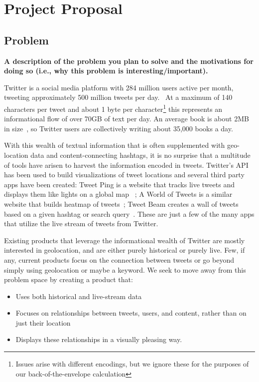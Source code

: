 \section{Project Proposal}

\subsection{Problem}
\textbf{A description of the problem you plan to solve and the motivations for doing so (i.e., why this problem is interesting/important).}

Twitter is a social media platform with 284 million users active per month, tweeting approximately 500 million tweets
per day.~\cite{twitter} At a maximum of 140 characters per tweet and about 1 byte per character\footnote{Issues arise with different
encodings, but we ignore these for the purposes of our back-of-the-envelope calculation} this represents an informational
flow of over 70GB of text per day. An average book is about 2MB in size~\cite{bookfact}, so Twitter users are collectively
writing about 35,000 books a day.

With this wealth of textual information that is often supplemented with geo-location data and content-connecting hashtags,
it is no surprise that a multitude of tools have arisen to harvest the information encoded in tweets. Twitter's
API~\cite{twitterAPI} has been used to build visualizations of tweet locations and several third party apps
have been created: Tweet Ping is a website that tracks live tweets and displays them like lights on a global map~\cite{tweetping1}
\cite{tweetping2}; A World of Tweets is a similar website that builds  heatmap of tweets~\cite{worldoftweets}; Tweet Beam
creates a wall of tweets based on a given hashtag or search query~\cite{tweetbeam}. These are just a few of the many apps that
utilize the live stream of tweets from Twitter.

Existing products that leverage the informational wealth of Twitter are mostly interested in geolocation, and are either
purely historical or purely live. Few, if any, current products focus on the connection between tweets or go beyond
simply using geolocation or maybe a keyword. We seek to move away from this problem space by creating a product that:
\begin{itemize}[noitemsep]
\item Uses both historical and live-stream data
\item Focuses on relationships between tweets, users, and content, rather than on just their location
\item Displays these relationships in a visually pleasing way.
\end{itemize}

